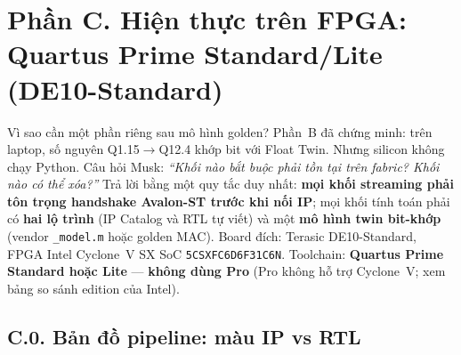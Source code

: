 

\section*{Phần C. Hiện thực trên FPGA: Quartus Prime Standard/Lite (DE10-Standard)}

\begin{firstprin}{Vì sao cần một phần riêng sau mô hình golden?}
Phần~B đã chứng minh: trên laptop, số nguyên Q1.15$\to$Q12.4 khớp bit với Float Twin. Nhưng silicon không chạy Python. Câu hỏi Musk: \emph{``Khối nào bắt buộc phải tồn tại trên fabric? Khối nào có thể xóa?''} Trả lời bằng một quy tắc duy nhất: \textbf{mọi khối streaming phải tôn trọng handshake Avalon-ST trước khi nối IP}; mọi khối tính toán phải có \textbf{hai lộ trình} (IP Catalog và RTL tự viết) và một \textbf{mô hình twin bit-khớp} (vendor \texttt{\_model.m} hoặc golden MAC). Board đích: Terasic DE10-Standard, FPGA Intel Cyclone~V SX SoC \texttt{5CSXFC6D6F31C6N}. Toolchain: \textbf{Quartus Prime Standard hoặc Lite} --- \textbf{không dùng Pro} (Pro không hỗ trợ Cyclone~V; xem bảng so sánh edition của Intel).
\end{firstprin}

\subsection*{C.0. Bản đồ pipeline: màu IP vs RTL}

